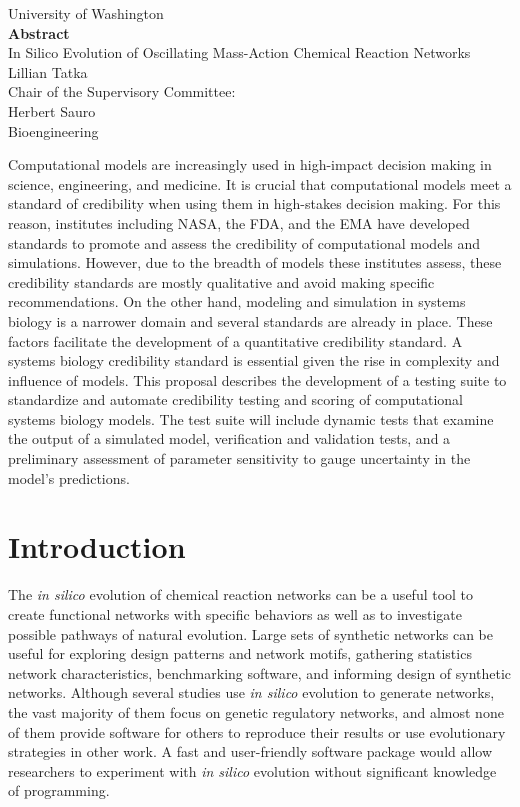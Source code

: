 \documentclass[12pt]{report}
\begin{document}
\begin{center}
University of Washington\\
\vspace*{\fill}
\textbf{Abstract} \\
\vspace*{\fill}
In Silico Evolution of Oscillating Mass-Action Chemical Reaction Networks\\
\vspace*{\fill}
Lillian Tatka\\
\vspace*{\fill}
Chair of the Supervisory Committee:\\
Herbert Sauro\\
Bioengineering
\end{center}
\vspace*{\fill}
Computational models are increasingly used in high-impact decision making in science, engineering, and medicine. It is crucial that computational models meet a standard of credibility when using them in high-stakes decision making. For this reason, institutes including NASA, the FDA, and the EMA have developed standards to promote and assess the credibility of computational models and simulations. However, due to the breadth of models these institutes assess, these credibility standards are mostly qualitative and avoid making specific recommendations. On the other hand, modeling and simulation in systems biology is a narrower domain and several standards are already in place. These factors facilitate the development of a quantitative credibility standard. A systems biology credibility standard is essential given the rise in complexity and influence of models. This proposal describes the development of a testing suite to standardize and automate credibility testing and scoring of computational systems biology models. The test suite will include dynamic tests that examine the output of a simulated model, verification and validation tests, and a preliminary assessment of parameter sensitivity to gauge uncertainty in the model's predictions. 

\tableofcontents



\chapter{Introduction}
The \textit{in silico} evolution of chemical reaction networks can be a useful tool to create functional networks with specific behaviors as well as to investigate possible pathways of natural evolution. Large sets of synthetic networks can be useful for exploring design patterns and network motifs, gathering statistics network characteristics, benchmarking software, and informing design of synthetic networks. Although several studies use \textit{in silico} evolution to generate networks, the vast majority of them focus on genetic regulatory networks, and almost none of them provide software for others to reproduce their results or use evolutionary strategies in other work. A fast and user-friendly software package would allow researchers to experiment with \textit{in silico} evolution without significant knowledge of programming. 
\end{document}
